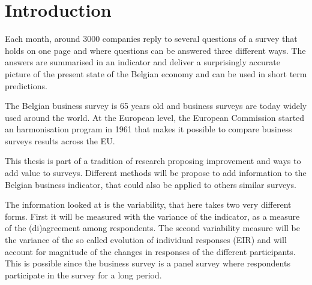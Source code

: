 \documentclass[12pt,a4paper,oneside]{book}
\begin{document}
\tableofcontents

\newpage
\setcounter{page}{0}


\chapter{Introduction}






Each month, around 3000 companies reply to several questions of a survey that holds on one page and where questions can be answered three different ways.
The answers are summarised in an indicator and deliver a surprisingly accurate picture of the present state of the Belgian economy and can be used in short term predictions.

The Belgian business survey is 65 years old and business surveys are today widely used around the world. 
At the European level, the European Commission started an harmonisation program in 1961 that makes it possible to compare business surveys results across the EU.

This thesis is part of a tradition of research proposing improvement and ways to add value to surveys. Different methods will be propose to add information to the Belgian business indicator, that could also be applied to others similar surveys.


The information looked at is the variability, that here takes two very different forms. 
First it will be measured with the variance of the indicator, as a measure of the (di)agreement among respondents.
The second variability measure will be the variance of the so called evolution of individual responses (EIR) and will account for magnitude of the changes in responses of the different participants. This is possible since the business survey is a panel survey where respondents participate in the survey for a long period.
\end{document}
